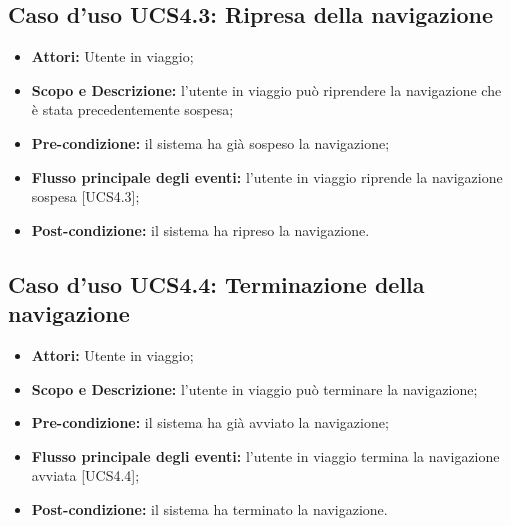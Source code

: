 \subsection{Caso d'uso UCS4.3: Ripresa della navigazione}
\begin{itemize}
\item \textbf{Attori:} Utente in viaggio;
\item \textbf{Scopo e Descrizione:} l'utente in viaggio può riprendere la navigazione che è stata precedentemente sospesa;
\item \textbf{Pre-condizione:} il sistema ha già sospeso la navigazione;
\item \textbf{Flusso principale degli eventi:} l'utente in viaggio riprende la navigazione sospesa [UCS4.3];
\item \textbf{Post-condizione:} il sistema ha ripreso la navigazione.
\end{itemize}


\subsection{Caso d'uso UCS4.4: Terminazione della navigazione}
\begin{itemize}
\item \textbf{Attori:} Utente in viaggio;
\item \textbf{Scopo e Descrizione:} l'utente in viaggio può terminare la navigazione;
\item \textbf{Pre-condizione:} il sistema ha già avviato la navigazione;
\item \textbf{Flusso principale degli eventi:} l'utente in viaggio termina la navigazione avviata [UCS4.4];
\item \textbf{Post-condizione:} il sistema ha terminato la navigazione.
\end{itemize}

